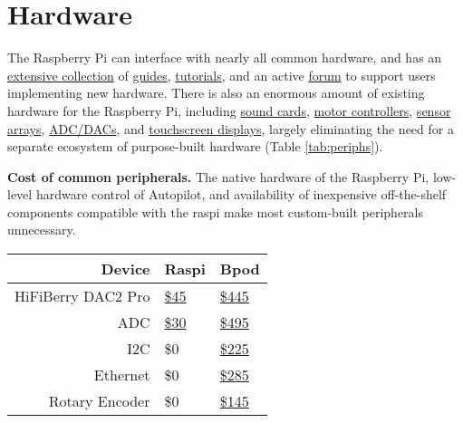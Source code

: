 \section{Hardware}
\label{sec:hardware}

The Raspberry Pi can interface with nearly all common hardware, and has an \href{https://www.raspberrypi.org/help/}{extensive collection} of \href{https://elinux.org/RPi_Guides}{guides}, \href{https://elinux.org/RPi_Tutorials}{tutorials}, and an active \href{https://www.raspberrypi.org/forums/}{forum} to support users implementing new hardware. There is also an enormous amount of existing hardware for the Raspberry Pi, including \href{https://www.hifiberry.com/}{sound cards}, \href{https://www.adafruit.com/product/2348}{motor controllers}, \href{https://www.digikey.com/product-detail/en/raspberry-pi/SENSE-HAT/1690-1013-ND/6196429}{sensor arrays}, \href{https://www.seeedstudio.com/Raspberry-Pi-High-Precision-AD-DA-Board-p-2765.html}{ADC/DACs}, and \href{https://www.digikey.com/product-detail/en/pimoroni-ltd/PIM369/1778-1221-ND/9521981}{touchscreen displays}, largely eliminating the need for a separate ecosystem of purpose-built hardware (Table \ref{tab:periphs}). 

\begin{margintable}[-0.75cm]
\caption{
\textbf{Cost of common peripherals.} The native hardware of the Raspberry Pi, low-level hardware control of Autopilot, and availability of inexpensive off-the-shelf components compatible with the raspi make most custom-built peripherals unnecessary.}
\label{tab:periphs}
\noindent\begin{tabularx}{\linewidth}{Rll}
\toprule
\textbf{Device} & Raspi & Bpod \\
\midrule
HiFiBerry DAC2 Pro & \href{https://www.hifiberry.com/shop/boards/hifiberry-dac2-pro/}{\$45} &  \href{https://sanworks.io/shop/viewproduct?productID=1032}{\$445}\\
ADC & \href{https://thepihut.com/products/high-precision-adc-hat-for-raspberry-pi-10-channel-32-bit}{\$30} & \href{https://sanworks.io/shop/viewproduct?productID=1021}{\$495}\\
I2C & \$0 & \href{https://sanworks.io/shop/viewproduct?productID=1019}{\$225} \\
Ethernet & \$0 & \href{https://sanworks.io/shop/viewproduct?productID=1025}{\$285} \\
Rotary Encoder & \$0 &  \href{https://sanworks.io/shop/viewproduct?productID=1022}{\$145}\\
\bottomrule
\end{tabularx}
\end{margintable}

